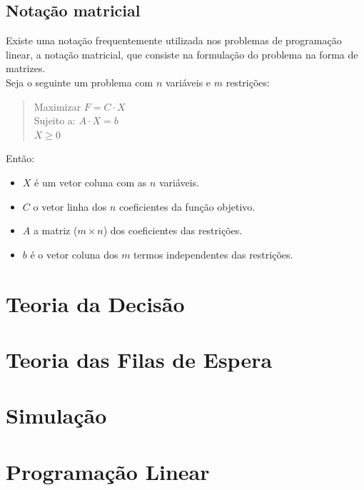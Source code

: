 \documentclass[]{report}
\begin{document}
\section{Notação matricial}
\begin{minipage}{\textwidth}
Existe uma notação frequentemente utilizada nos problemas de programação linear, a notação matricial, que consiste na formulação do problema na forma de matrizes.\\[0.5cm]
Seja o seguinte um problema com $n$ variáveis e $m$ restrições:
\begin{quotation}
\noindent Maximizar $F=C \cdot X$\\
Sujeito a: $A \cdot X = b$\\
\indent\indent\indent $X \geq 0$
\end{quotation}
Então:
\begin{itemize}
\item $X$ é um vetor coluna com as $n$ variáveis.
\item $C$ o vetor linha dos $n$ coeficientes da função objetivo.
\item $A$ a matriz ($m \times n$) dos coeficientes das restrições.
\item $b$ é o vetor coluna dos $m$ termos independentes das restrições.
\end{itemize}
\end{minipage}
\chapter{Teoria da Decisão}
\chapter{Teoria das Filas de Espera}
\chapter{Simulação}
\chapter{Programação Linear}
\end{document}
